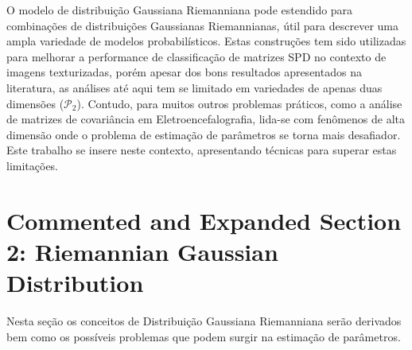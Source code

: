 \documentclass[a4paper,titlepage]{article}
\begin{document}
\begin{center}
  \vspace{1em}
  \vspace{1em}
\end{center}

O modelo de distribuição Gaussiana Riemanniana pode estendido para combinações
de distribuições Gaussianas Riemannianas, útil para descrever uma ampla
variedade de modelos probabilísticos. Estas construções tem sido utilizadas
para melhorar a performance de classificação de matrizes SPD no contexto de
imagens texturizadas, porém apesar dos bons resultados apresentados na
literatura, as análises até aqui tem se limitado em variedades de apenas duas
dimensões ($\mathcal{P}_2$). Contudo, para muitos outros problemas práticos,
como a análise de matrizes de covariância em Eletroencefalografia, lida-se com
fenômenos de alta dimensão onde o problema de estimação de parâmetros se torna
mais desafiador. Este trabalho se insere neste contexto, apresentando técnicas
para superar estas limitações.


\section{Commented and Expanded Section 2: Riemannian Gaussian Distribution}
Nesta seção os conceitos de Distribuição Gaussiana Riemanniana serão derivados
bem como os possíveis problemas que podem surgir na estimação de parâmetros.
\end{document}
